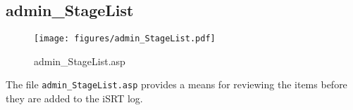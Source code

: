 \subsection{admin\_StageList}
\begin{figure}[htb]
    \begin{center}
        \texttt{[image: figures/admin\_StageList.pdf]}
    \end{center}
    \caption{admin\_StageList.asp}
    \label{fig:admin_StageList}
\end{figure}

The file \verb|admin_StageList.asp| provides a means for reviewing the items
before they are added to the iSRT log.

